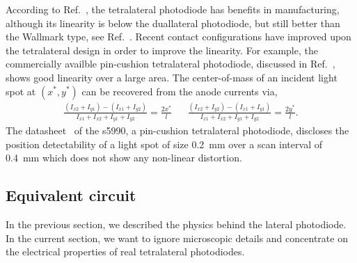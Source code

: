 According to Ref.~\cite[p.~41]{Noorlag74}, the tetralateral photodiode has benefits in manufacturing, although its linearity is below the duallateral photodiode, but still better than the Wallmark type, see Ref.~\cite{Woltring75}.
Recent contact configurations have improved upon the tetralateral design in order to improve the linearity.
For example, the commercially availble pin-cushion tetralateral photodiode, discussed in Ref.~\cite{Doke87,Wang89}, shows good linearity over a large area.
The center-of-mass of an incident light spot at $(x^*,y^*)$ can be recovered from the anode currents via,
\begin{align}
	\frac{\left(I_{x2}+I_{y1}\right)-\left(I_{x1}+I_{y2}\right)}{I_{x1}+I_{x2}+I_{y1}+I_{y2}}=\frac{2x^*}{l} &&
	\frac{\left(I_{x2}+I_{y2}\right)-\left(I_{x1}+I_{y1}\right)}{I_{x1}+I_{x2}+I_{y1}+I_{y2}}=\frac{2y^*}{l}	.
\end{align}
The datasheet~\cite{HamamatsuS5990} of the \gls{s5990}, a pin-cushion tetralateral photodiode, discloses the position detectability of a light spot of size \SI{0.2}{\milli\meter} over a scan interval of \SI{0.4}{\milli\meter} which does not show any non-linear distortion.

\subsection{Equivalent circuit}

In the previous section, we described the physics behind the lateral photodiode.
In the current section, we want to ignore microscopic details and concentrate on the electrical properties of real tetralateral photodiodes.

